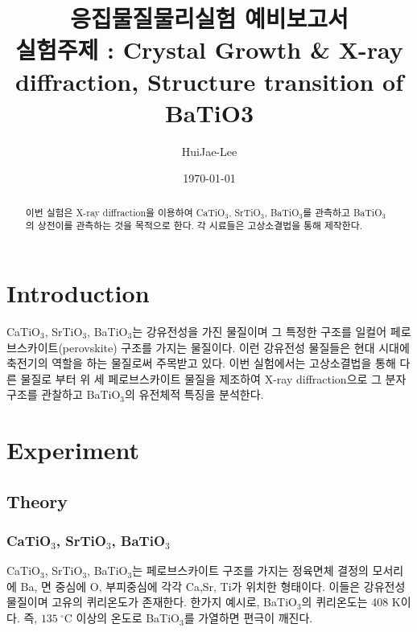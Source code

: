\documentclass[aps,reprint,superscriptaddress,11pt]{revtex4-2}
\begin{document}
\title{응집물질물리실험 예비보고서 \\
\small 실험주제 : Crystal Growth \& X-ray diffraction,
Structure transition of BaTiO3}

\author{HuiJae-Lee}

\date{\today}


\begin{abstract}
이번 실험은 X-ray diffraction을 이용하여 CaTiO$_3$, SrTiO$_3$, BaTiO$_3$를 관측하고
BaTiO$_3$의 상전이를 관측하는 것을 목적으로 한다. 각 시료들은 고상소결법을 통해 제작한다.
 \end{abstract}
 
 \maketitle
 
\section[Introduction]{Introduction}
CaTiO$_3$, SrTiO$_3$, BaTiO$_3$는 강유전성을 가진 물질이며 그 특정한 구조를 일컬어 
페로브스카이트(perovskite) 구조를 가지는 물질이다. 이런 강유전성 물질들은 현대 시대에 
축전기의 역할을 하는 물질로써 주목받고 있다. 이번 실험에서는 고상소결법을 통해 다른 물질로
부터 위 세 페로브스카이트 물질을 제조하여 X-ray diffraction으로 그 분자구조를 관찰하고
BaTiO$_3$의 유전체적 특징을 분석한다.
\section[Experiment]{Experiment}
\subsection{Theory}
\subsubsection{CaTiO$_3$, SrTiO$_3$, BaTiO$_3$}

CaTiO$_3$, SrTiO$_3$, BaTiO$_3$는 페로브스카이트 구조를 가지는 정육면체 결정의 모서리에
Ba, 면 중심에 O, 부피중심에 각각 Ca,Sr, Ti가 위치한 형태이다. 이들은 강유전성 물질이며 
고유의 퀴리온도가 존재한다. 한가지 예시로, BaTiO$_3$의 
퀴리온도는 408 K이다. 즉, $135~\mathrm{^\circ C}$ 이상의 온도로 BaTiO$_3$를 가열하면
편극이 깨진다.
\end{document}
